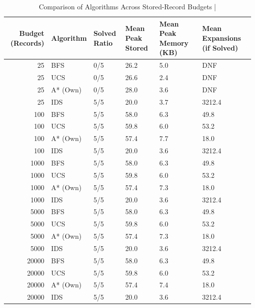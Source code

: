 \begin{table}[htbp]
\centering
\caption{Comparison of Algorithms Across Stored-Record Budgets | \stampline}
\label{tab:partB_ids_budget_sweep}
\begin{tabular}{rlllll}
\toprule
Budget (Records) & Algorithm & Solved Ratio & Mean Peak Stored & Mean Peak Memory (KB) & Mean Expansions (if Solved) \\
\midrule
25 & BFS & 0/5 & 26.2 & 5.0 & DNF \\
25 & UCS & 0/5 & 26.6 & 2.4 & DNF \\
25 & A* (Own) & 0/5 & 28.0 & 3.6 & DNF \\
25 & IDS & 5/5 & 20.0 & 3.7 & 3212.4 \\
100 & BFS & 5/5 & 58.0 & 6.3 & 49.8 \\
100 & UCS & 5/5 & 59.8 & 6.0 & 53.2 \\
100 & A* (Own) & 5/5 & 57.4 & 7.7 & 18.0 \\
100 & IDS & 5/5 & 20.0 & 3.6 & 3212.4 \\
1000 & BFS & 5/5 & 58.0 & 6.3 & 49.8 \\
1000 & UCS & 5/5 & 59.8 & 6.0 & 53.2 \\
1000 & A* (Own) & 5/5 & 57.4 & 7.3 & 18.0 \\
1000 & IDS & 5/5 & 20.0 & 3.6 & 3212.4 \\
5000 & BFS & 5/5 & 58.0 & 6.3 & 49.8 \\
5000 & UCS & 5/5 & 59.8 & 6.0 & 53.2 \\
5000 & A* (Own) & 5/5 & 57.4 & 7.3 & 18.0 \\
5000 & IDS & 5/5 & 20.0 & 3.6 & 3212.4 \\
20000 & BFS & 5/5 & 58.0 & 6.3 & 49.8 \\
20000 & UCS & 5/5 & 59.8 & 6.0 & 53.2 \\
20000 & A* (Own) & 5/5 & 57.4 & 7.4 & 18.0 \\
20000 & IDS & 5/5 & 20.0 & 3.6 & 3212.4 \\
\bottomrule
\end{tabular}

\end{table}
